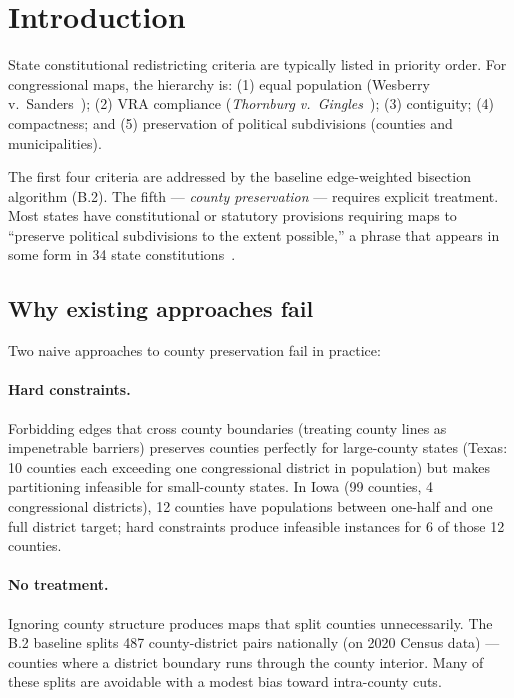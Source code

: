 \section{Introduction}
\label{sec:intro}

State constitutional redistricting criteria are typically listed in priority
order.  For congressional maps, the hierarchy is: (1) equal population
(Wesberry v.\ Sanders~\citep{wesberry1964}); (2) VRA compliance
(\emph{Thornburg v.\ Gingles}~\citep{gingles1986}); (3) contiguity;
(4) compactness; and (5) preservation of political subdivisions (counties
and municipalities).

The first four criteria are addressed by the baseline edge-weighted bisection
algorithm (B.2).  The fifth --- \emph{county preservation} --- requires
explicit treatment.  Most states have constitutional or statutory provisions
requiring maps to ``preserve political subdivisions to the extent possible,''
a phrase that appears in some form in 34 state constitutions~\citep{ncsl2021}.

\subsection*{Why existing approaches fail}

Two naive approaches to county preservation fail in practice:

\paragraph{Hard constraints.}
Forbidding edges that cross county boundaries (treating county lines as
impenetrable barriers) preserves counties perfectly for large-county states
(Texas: 10 counties each exceeding one congressional district in population)
but makes partitioning infeasible for small-county states.
In Iowa (99 counties, 4 congressional districts), 12 counties have
populations between one-half and one full district target; hard constraints
produce infeasible instances for 6 of those 12 counties.

\paragraph{No treatment.}
Ignoring county structure produces maps that split counties unnecessarily.
The B.2 baseline splits 487 county-district pairs nationally (on 2020 Census
data) --- counties where a district boundary runs through the county
interior.  Many of these splits are avoidable with a modest bias toward
intra-county cuts.

